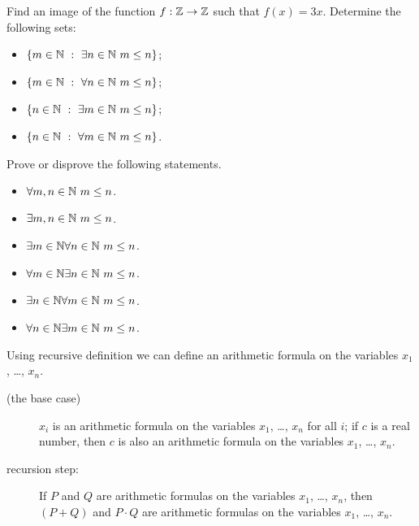 \begin{chapterendexercises}
  \exercise Find an image of the function $f : \mathbb{Z} \to \mathbb{Z}$ such that
    $f(x) = 3x$.
  \exercise[recommended] Determine the following sets:
    \begin{itemize}
      \item $\set[\exists n \in \N \ m \le n]{m \in \N}$;
      \item $\set[\forall n \in \N \ m \le n]{m \in \N}$;
      \item $\set[\exists m \in \N \ m \le n]{n \in \N}$;
      \item $\set[\forall m \in \N \ m \le n]{n \in \N}$.
    \end{itemize}
  \exercise Prove or disprove the following statements.
    \begin{itemize}
      \item $\forall m, n \in \mathbb{N} \ m \le n$.
      \item $\exists m, n \in \mathbb{N} \ m \le n$.
      \item $\exists m \in \mathbb{N} \forall n \in \mathbb{N} \ m \le n$.
      \item $\forall m \in \mathbb{N} \exists n \in \mathbb{N} \ m \le n$.
      \item $\exists n \in \mathbb{N} \forall m \in \mathbb{N} \ m \le n$.
      \item $\forall n \in \mathbb{N} \exists m \in \mathbb{N} \ m \le n$.
    \end{itemize}

  \exercise[recommended]
    Using recursive definition we can define an arithmetic formula on the
    variables $x_1$, \dots, $x_n$.
    \begin{description}
      \item [(the base case)] $x_i$ is an arithmetic formula on the variables $x_1$,
        \dots, $x_n$ for all $i$; if $c$ is a real number, then $c$ is also
        an arithmetic formula on the variables $x_1$, \dots, $x_n$.
      \item[recursion step:] If $P$ and $Q$ are arithmetic formulas on the variables
        $x_1$, \dots, $x_n$, then $(P + Q)$ and $P \cdot Q$ are arithmetic formulas
        on the variables $x_1$, \dots, $x_n$.
    \end{description}


\end{chapterendexercises}
